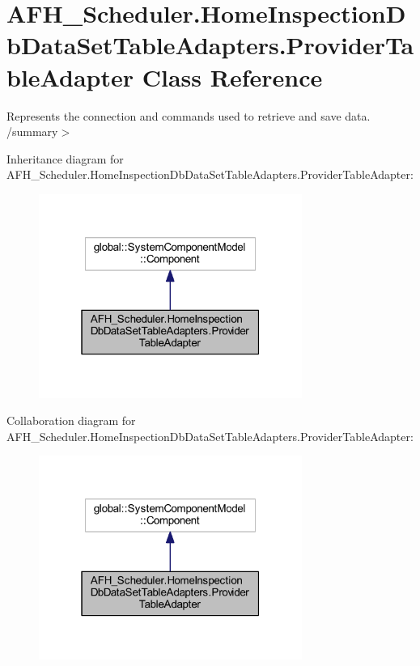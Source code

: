 \section{A\+F\+H\+\_\+\+Scheduler.\+Home\+Inspection\+Db\+Data\+Set\+Table\+Adapters.\+Provider\+Table\+Adapter Class Reference}
\label{class_a_f_h___scheduler_1_1_home_inspection_db_data_set_table_adapters_1_1_provider_table_adapter}


Represents the connection and commands used to retrieve and save data. /summary$>$  




Inheritance diagram for A\+F\+H\+\_\+\+Scheduler.\+Home\+Inspection\+Db\+Data\+Set\+Table\+Adapters.\+Provider\+Table\+Adapter\+:
\nopagebreak
\begin{figure}[H]
\begin{center}
\leavevmode
\includegraphics[width=244pt]{class_a_f_h___scheduler_1_1_home_inspection_db_data_set_table_adapters_1_1_provider_table_adapter__inherit__graph}
\end{center}
\end{figure}


Collaboration diagram for A\+F\+H\+\_\+\+Scheduler.\+Home\+Inspection\+Db\+Data\+Set\+Table\+Adapters.\+Provider\+Table\+Adapter\+:
\nopagebreak
\begin{figure}[H]
\begin{center}
\leavevmode
\includegraphics[width=244pt]{class_a_f_h___scheduler_1_1_home_inspection_db_data_set_table_adapters_1_1_provider_table_adapter__coll__graph}
\end{center}
\end{figure}
